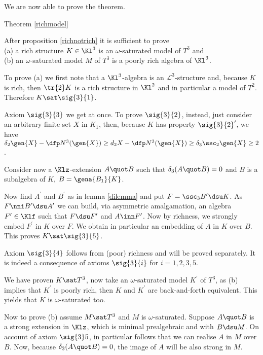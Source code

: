 We are now able to prove the theorem.
\begin{proofof}{Theorem \ref{richmodel}}

After proposition \ref{richnotrich} it is sufficient to prove\\
{(a)} a rich structure $K\in\Kl^{3}$ is an $\omega$-saturated model of $T^{3}$ and\\
{(b)} an $\omega$-saturated model $M$ of $T^{3}$ is a poorly rich algebra of $\Kl^{3}$.

\medskip
To prove {(a)} we first note that a $\Kl^{3}$-algebra is an $\mathcal{L}^{3}$-structure and,
because $K$ is %
rich, then $\tr{2}K$ is a rich structure in $\Kl^{2}$ and in particular a model of $T^{2}$.
Therefore $K\sat\sig{3}{1}$.

Axiom $\sig{3}{3}$ we get at once.
To prove $\sig{3}{2}$, instead, just consider an arbitrary finite set
$X$ in $K_{1}$, then, because $K$ has property $\sig{3}{2} ^{\prime}$, we have $\delta_{2}\gen{X}-\dfp N^{3}(\gen{X})\geq
d_{2}X-\dfp N^{3}(\gen{X})\geq\delta_{3}\ssc_{2}\gen{X}\geq2$.

Consider now a $\Klz$-extension $A\quot B$ such that $\delta_{3}(A\quot B)=0$ and $B$ is a subalgebra
of $K$, $B=\gena{B_{1}}{K}$.

Now find $A^{\prime}$ and $B^{\prime}$ as in lemma \ref{dilemma} and 
put $F=\ssc_{3}B^{\prime}\dsu K$. As $F\nni B^{\prime}\dsu A^{\prime}$ we can build, via asymmetric amalgamation, an algebra $F^{\prime}\in\Klf$ such
that $F\dsu F^{\prime}$ and $A\inn F^{\prime}$. Now by richness, we strongly embed $F^{\prime}$ in $K$ over $F$. We obtain in particular an embedding of $A$ in $K$ over $B$.
This proves $K\sat\sig{3}{5}$.

Axiom $\sig{3}{4}$ follows from (poor) richness and will be proved separately. It is indeed a consequence
of axioms $\sig{3}{i}$ for $i=1,2,3,5$.

We have proven $K\sat T^{3}$, now take an $\omega$-saturated model $K^{\prime}$ of $T^{3}$,
as {(b)} implies that $K^{\prime}$ is poorly rich, then $K$ and $K^{\prime}$ are back-and-forth equivalent.
This yields that $K$ is $\omega$-saturated too.

\medskip
Now to prove {(b)} assume $M\sat T^{3}$ and $M$ is $\omega$-saturated. Suppose $A\quot B$ is
a strong extension in $\Klz$, which is minimal prealgebraic and with $B\dsu M$.
On account of axiom $\sig{3}5{}$, in particular follows that we can realise $A$ in $M$ over $B$.
Now, because $\delta_{3}(A\quot B)=0$, the image of $A$ will be also strong in $M$.


\end{proofof}
